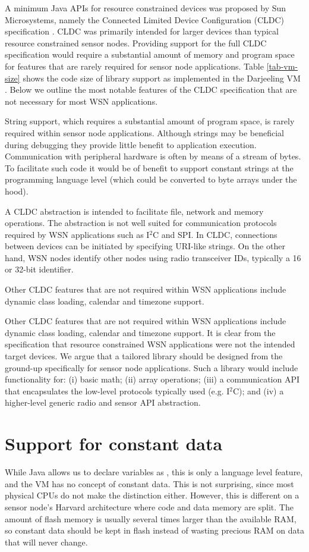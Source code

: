 A minimum Java APIs for resource constrained devices was proposed by Sun Microsystems, namely the Connected Limited Device Configuration (CLDC) specification \cite{CLDC}.  CLDC was primarily intended for larger devices than typical resource constrained sensor nodes.  Providing support for the full CLDC specification would require a substantial amount of memory and program space for features that are rarely required for sensor node applications. Table \ref{tab-vm-size} shows the code size of library support as implemented in the Darjeeling VM \cite{Brouwers:2009cj}.  Below we outline the most notable features of the CLDC specification that are not necessary for most WSN applications.

String support, which requires a substantial amount of program space, is rarely required within sensor node applications. Although strings may be beneficial during debugging they provide little benefit to application execution. Communication with peripheral hardware is often by means of a stream of bytes. To facilitate such code it would be of benefit to support constant strings at the programming language level (which could be converted to byte arrays under the hood).

A CLDC  abstraction is intended to facilitate file, network and memory operations. The abstraction is not well suited for communication protocols required by WSN applications such as I$^{2}$C and SPI. In CLDC, connections between devices can be initiated by specifying URI-like strings. On the other hand, WSN nodes identify other nodes using radio transceiver IDs, typically a 16 or 32-bit identifier.

Other CLDC features that are not required within WSN applications include dynamic class loading, calendar and timezone support.

Other CLDC features that are not required within WSN applications include dynamic class loading, calendar and timezone support. It is clear from the specification that resource constrained WSN applications were not the intended target devices. We argue that a tailored library should be designed from the ground-up specifically for sensor node applications. Such a library would include functionality for: (i) basic math; (ii) array operations; (iii) a communication API that encapsulates the low-level protocols typically used (e.g. I$^{2}$C); and (iv) a higher-level generic radio and sensor API abstraction.

\section{Support for constant data}
\label{sec-const-data}
While Java allows us to declare variables as , this is only a language level feature, and the VM has no concept of constant data. This is not surprising, since most physical CPUs do not make the distinction either. However, this is different on a sensor node's Harvard architecture where code and data memory are split. The amount of flash memory is usually several times larger than the available RAM, so constant data should be kept in flash instead of wasting precious RAM on data that will never change.

